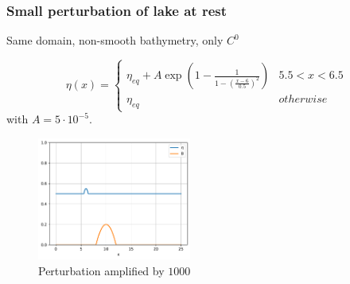 \documentclass[pt12]{beamer}
\begin{document}
\begin{frame}
\frametitle{Small perturbation of lake at rest}
Same domain, non-smooth bathymetry, only $C^0$

$$\eta(x)=\begin{cases}
\eta_{eq}+A\exp{\left(1-\frac{1}{1-\left(\frac{x-6}{0.5}\right)^2}\right)} & 5.5<x<6.5\\
\eta_{eq} & otherwise
\end{cases}$$
with $A=5\cdot 10^{-5}$.

\begin{figure}
         \centering
         \includegraphics[width=0.45\textwidth]{alb_latr_pert_IC.pdf}
         \caption{Perturbation amplified by $1000$}
\end{figure}


\end{frame}
\end{document}
